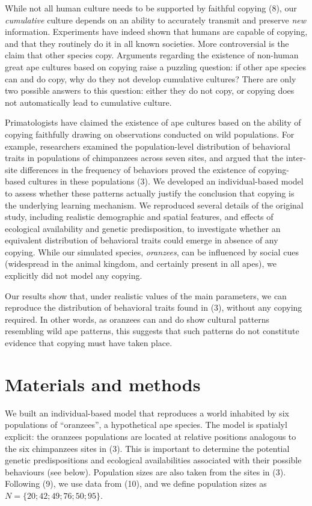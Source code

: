 \documentclass[9pt,twocolumn,twoside,]{pnas-new}
\begin{document}
While not all human culture needs to be supported by faithful copying
(8), our \emph{cumulative} culture depends on an ability to accurately
transmit and preserve \emph{new} information. Experiments have indeed
shown that humans are capable of copying, and that they routinely do it
in all known societies. More controversial is the claim that other
species copy. Arguments regarding the existence of non-human great ape
cultures based on copying raise a puzzling question: if other ape
species can and do copy, why do they not develop cumulative cultures?
There are only two possible answers to this question: either they do not
copy, or copying does not automatically lead to cumulative culture.

Primatologists have claimed the existence of ape cultures based on the
ability of copying faithfully drawing on observations conducted on wild
populations. For example, researchers examined the population-level
distribution of behavioral traits in populations of chimpanzees across
seven sites, and argued that the inter-site differences in the frequency
of behaviors proved the existence of copying-based cultures in these
populations (3). We developed an individual-based model to assess
whether these patterns actually justify the conclusion that copying is
the underlying learning mechanism. We reproduced several details of the
original study, including realistic demographic and spatial features,
and effects of ecological availability and genetic predisposition, to
investigate whether an equivalent distribution of behavioral traits
could emerge in absence of any copying. While our simulated species,
\emph{oranzees}, can be influenced by social cues (widespread in the
animal kingdom, and certainly present in all apes), we explicitly did
not model any copying.

Our results show that, under realistic values of the main parameters, we
can reproduce the distribution of behavioral traits found in (3),
without any copying required. In other words, as oranzees can and do
show cultural patterns resembling wild ape patterns, this suggests that
such patterns do not constitute evidence that copying must have taken
place.

\section*{Materials and methods}\label{materials-and-methods}

We built an individual-based model that reproduces a world inhabited by
six populations of ``oranzees'', a hypothetical ape species. The model
is spatialyl explicit: the oranzees populations are located at relative
positions analogous to the six chimpanzees sites in (3). This is
important to determine the potential genetic predispositions and
ecological availabilities associated with their possible behaviours (see
below). Population sizes are also taken from the sites in (3). Following
(9), we use data from (10), and we define population sizes as
\(N=\{20;42;49;76;50;95\}\).
\end{document}
